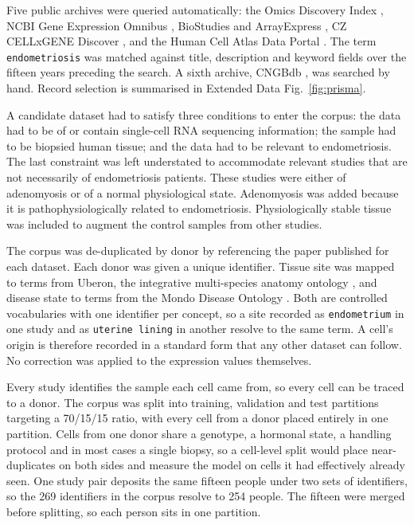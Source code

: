 Five public
archives were queried automatically: the Omics Discovery Index
\citep{perezriverol2017omicsdi}, NCBI Gene Expression Omnibus
\citep{barrett2013geo}, BioStudies \citep{sarkans2018biostudies} and
ArrayExpress \citep{athar2019arrayexpress}, CZ CELLxGENE Discover
\citep{czi2023cellxgene}, and the Human Cell Atlas Data Portal
\citep{regev2017hca}.
The term \texttt{endometriosis} was matched against title, description
and keyword fields over the fifteen years preceding the search. A sixth
archive, CNGBdb \citep{chen2020cngbdb}, was searched by hand. Record selection
is summarised in Extended Data Fig.~\ref{fig:prisma}.

A candidate dataset had to satisfy three conditions to enter the corpus: the data
had to be of or contain single-cell RNA sequencing information; the
sample had to be biopsied human tissue; and the data had to be
relevant to endometriosis. The last constraint was left understated to
accommodate relevant studies that are not necessarily of endometriosis
patients. These studies were either of adenomyosis or of a normal 
physiological state. Adenomyosis was added because it is 
pathophysiologically related to endometriosis. Physiologically stable 
tissue was included to augment the control samples from other studies.

The corpus was de-duplicated by donor by referencing the paper published
for each dataset. Each donor was given a unique identifier. Tissue site was mapped to terms from
Uberon, the integrative multi-species anatomy ontology
\citep{mungall2012uberon}, and disease state to terms from the Mondo
Disease Ontology \citep{vasilevsky2022mondo}. Both are controlled
vocabularies with one identifier per concept, so a site recorded as
\texttt{endometrium} in one study and as \texttt{uterine lining} in another
resolve to the same term. A cell's origin is therefore recorded in a
standard form that any other dataset can follow. No correction was applied to the expression values 
themselves.

Every study identifies the sample each cell came from, so every cell can
be traced to a donor. The corpus was split into training, validation and
test partitions targeting a 70/15/15 ratio, with every cell from a donor
placed entirely in one partition. Cells from one donor share a genotype,
a hormonal state, a handling protocol and in most cases a single biopsy,
so a cell-level split would place near-duplicates on both sides and
measure the model on cells it had effectively already seen. One study
pair deposits the same fifteen people under two sets of identifiers, so
the 269 identifiers in the corpus resolve to 254 people. The fifteen were
merged before splitting, so each person sits in one partition.



